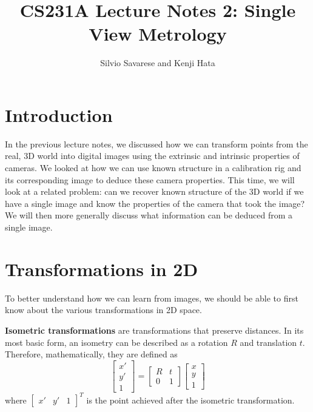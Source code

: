 \documentclass[a4paper, 12pt]{article}
\title{CS231A Lecture Notes 2: Single View Metrology}
\author{Silvio Savarese and Kenji Hata}
\date{}
\renewcommand\emph{\textbf}
\begin{document}
\maketitle

\section{Introduction}
In the previous lecture notes, we discussed how we can transform points from the real, 3D world into digital images using the extrinsic and intrinsic properties of cameras. We looked at how we can use known structure in a calibration rig and its corresponding image to deduce these camera properties. This time, we will look at a related problem: can we recover known structure of the 3D world if we have a single image and know the properties of the camera that took the image? We will then more generally discuss what information can be deduced from a single image.

\section{Transformations in 2D}
To better understand how we can learn from images, we should be able to first know about the various transformations in 2D space. 

\emph{Isometric transformations} are transformations that preserve distances. In its most basic form, an isometry can be described as a rotation $R$  and translation $t$. Therefore, mathematically, they are defined as
\begin{equation*}
    \begin{bmatrix}x'\\y'\\1\end{bmatrix} = \begin{bmatrix}R & t\\ 0 & 1\end{bmatrix}\begin{bmatrix}x\\y\\1\end{bmatrix}
\end{equation*}
where $\begin{bmatrix}x'&y'&1\end{bmatrix}^T$ is the point achieved after the isometric transformation. 
\end{document}
